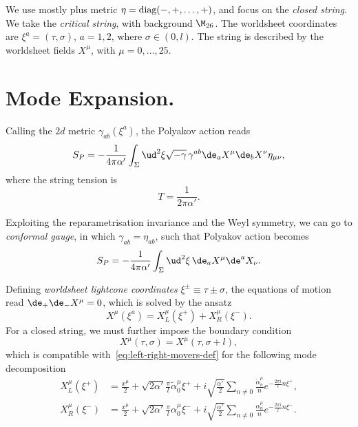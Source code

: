 
We use mostly plus metric $\eta = \textup{diag}(-,+,\dots,+)$, and focus on the \emph{closed string}. We take the \emph{critical string}, with background $\M_{26}$. The worldsheet coordinates are $\xi^a = (\tau, \sigma)$, $a= 1,2$, where $\sigma \in (0,l)$. The string is described by the worldsheet fields $X^{{\mu}}$, with ${\mu} = 0, \dots, 25$. 

\section{Mode Expansion.}\label{sec:bosonic-mode-expansion}
Calling the $2d$ metric $\gamma_{ab}(\xi^a)$, the Polyakov action reads
\begin{equation}\label{eq:polyakov-action}
    S_P= -\frac{1}{4\pi\alpha'} \int_\Sigma \ud^2 \xi \sqrt{-\gamma} \, \gamma^{ab} \de_a X^{{\mu}} \de_b X^{{\nu}} \eta_{{\mu}{\nu}} ,
\end{equation}
where the string tension is
\begin{equation}
    T = \frac{1}{2\pi\alpha'} .
\end{equation}

Exploiting the reparametrisation invariance and the Weyl symmetry, we can go to \emph{conformal gauge}, in which $\gamma_{ab} = \eta_{ab}$, such that Polyakov action becomes
\begin{equation}\label{eq:polyakov-conformal-gauge}
    S_P= -\frac{1}{4\pi\alpha'} \int_\Sigma \ud^2 \xi \, \de_a X^{{\mu}} \de^a X_{{\nu}}  .
\end{equation}

Defining \emph{worldsheet lightcone coordinates} $\xi^\pm \equiv \tau \pm \sigma$, the equations of motion read $\de_+\de_- X^\mu = 0$, which is solved by the ansatz
\begin{equation}\label{eq:left-right-movers-def}
    X^{{\mu}}(\xi^a) = X^{{\mu}}_L(\xi^+) + X^{{\mu}}_R(\xi^-) .
\end{equation}
For a closed string, we must further impose the boundary condition
\begin{equation}\label{eq:boundary-condition}
    X^\mu (\tau,\sigma) = X^\mu (\tau, \sigma + l),
\end{equation}
which is compatible with~\eqref{eq:left-right-movers-def} for the following mode decomposition
\begin{subequations}\label{eq:mode-expansion}
\begin{align}
    X^\mu_L(\xi^+) &= \frac{x^\mu}{2} + \sqrt{2\alpha'} \frac{\pi}{l} \tilde{\alpha}^\mu_0 \xi^+ + i \sqrt{\frac{\alpha'}{2}} \sum_{n\neq 0} \frac{\tilde{\alpha}^\mu_n}{n}e^{-\frac{2\pi i}{l}n \xi^+} ,\\
    X^\mu_R(\xi^-) &= \frac{x^\mu}{2} + \sqrt{2\alpha'} \frac{\pi}{l} {\alpha}^\mu_0 \xi^- + i \sqrt{\frac{\alpha'}{2}} \sum_{n\neq 0} \frac{{\alpha}^\mu_n}{n}e^{-\frac{2\pi i}{l}n \xi^-} .
\end{align}
\end{subequations}

